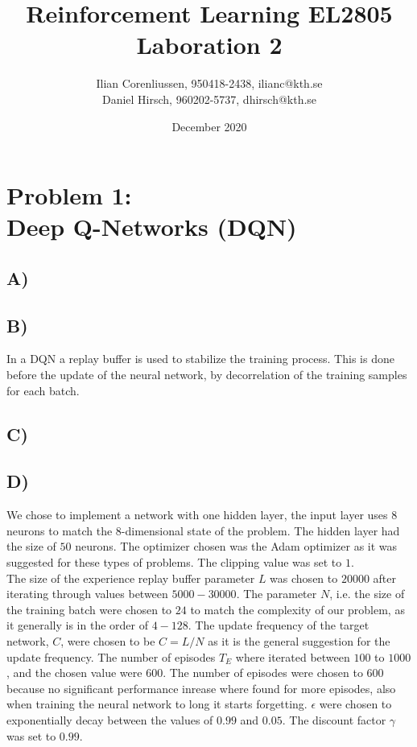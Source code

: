 \documentclass{article}
\title{Reinforcement Learning EL2805\\
       Laboration 2}
\author{Ilian Corenliussen, 950418-2438, ilianc@kth.se\\ 
        Daniel Hirsch, 960202-5737, dhirsch@kth.se}
\date{December 2020}
\begin{document}
\maketitle

\section*{Problem 1: \\
        Deep Q-Networks (DQN)}
\subsection*{A)}

\subsection*{B)} In a DQN a replay buffer is used to stabilize the training process. This is done before the update of the neural network, by decorrelation of the training samples for each batch. 

\subsection*{C)}

\subsection*{D)}
We chose to implement a network with one hidden layer, the input layer uses $8$ neurons to match the 8-dimensional state of the problem. The hidden layer had the size of $50$ neurons. The optimizer chosen was the Adam optimizer as it was suggested for these types of problems. The clipping value was set to $1$.\\%

\noindent The size of the experience replay buffer parameter $L$ was chosen to $20000$ after iterating through values between $5000 - 30000$. The parameter $N$, i.e. the size of the training batch were chosen to $24$ to match the complexity of our problem, as it generally is in the order of $4 - 128$.
The update frequency of the target network, $C$, were chosen to be $C = L/N$ as it is the general suggestion for the update frequency. The number of episodes $T_E$ where iterated between $100$ to $1000$, and the chosen value were $600$. The number of episodes were chosen to $600$ because no significant performance inrease where found for more episodes, also when training the neural network to long it starts forgetting. $\epsilon$ were chosen to exponentially decay between the values of $0.99$ and $0.05$. The discount factor $\gamma$ was set to $0.99$. 
\end{document}
